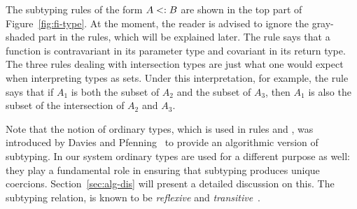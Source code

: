 

The subtyping rules of the form $A <: B$ are shown in the top part of
Figure~\ref{fig:fi-type}. At the moment, the reader is advised to ignore the
gray-shaded part in the rules, which will be explained later. The rule
 says that a function is contravariant in its parameter
type and covariant in its return type. The three rules dealing with
intersection types are just what one would expect when interpreting types as
sets. Under this interpretation, for example, the rule 
says that if $A_1$ is both the subset of $A_2$ and the subset of $A_3$, then
$A_1$ is also the subset of the intersection of $A_2$ and $A_3$.

Note that the notion of ordinary types, which is used in rules
 and , was
introduced by Davies and Pfenning~\cite{davies2000intersection} to provide an algorithmic version of
subtyping. In our system ordinary types are used for a different 
purpose as well: they play a fundamental role in ensuring that 
subtyping produces unique coercions. Section~\ref{sec:alg-dis} will present 
a detailed discussion on this. The subtyping relation, is known to be
\emph{reflexive} and \emph{transitive}~\cite{davies2000intersection}. 

\begin{comment}
\begin{lemma}[Subtyping is reflexive] \label{lemma:sub-refl}
  For all types $ A $, $ A \subtype A $.
\end{lemma}

\begin{lemma}[Subtyping is transitive] \label{lemma:sub-trans}
  If $ A_1 \subtype A_2 $ and $ A_2 \subtype A_3 $,
  then $ A_1 \subtype A_3 $.
\end{lemma}
\end{comment}

